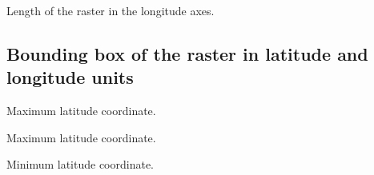 \documentclass[letterpaper,10pt,english]{sphinxmanual}
\begin{document}

\begin{fulllineitems}
\label{\detokenize{usage:tocdata.TOCData.lenLon}}
\pysigstartsignatures
{}
\pysigstopsignatures
\sphinxAtStartPar
Length of the raster in the longitude axes.

\end{fulllineitems}



\subsection{Bounding box of the raster in latitude and longitude units}
\label{\detokenize{usage:bounding-box-of-the-raster-in-latitude-and-longitude-units}}

\begin{fulllineitems}
\label{\detokenize{usage:tocdata.TOCData.maxLat}}
\pysigstartsignatures
{}
\pysigstopsignatures
\sphinxAtStartPar
Maximum latitude coordinate.

\end{fulllineitems}


\begin{fulllineitems}
\label{\detokenize{usage:tocdata.TOCData.maxLon}}
\pysigstartsignatures
{}
\pysigstopsignatures
\sphinxAtStartPar
Maximum latitude coordinate.

\end{fulllineitems}


\begin{fulllineitems}
\label{\detokenize{usage:tocdata.TOCData.minLat}}
\pysigstartsignatures
{}
\pysigstopsignatures
\sphinxAtStartPar
Minimum latitude coordinate.

\end{fulllineitems}
\end{document}
